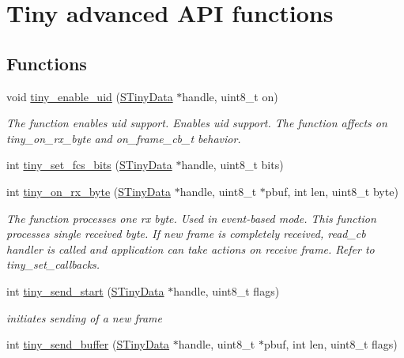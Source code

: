 \hypertarget{group__ADVANCED__API}{}\section{Tiny advanced A\+P\+I functions}
\label{group__ADVANCED__API}
\subsection*{Functions}
\begin{DoxyCompactItemize}
\item 
void \hyperlink{group__ADVANCED__API_gac5cabf56a5b22e96036b9e5bff926f1d}{tiny\+\_\+enable\+\_\+uid} (\hyperlink{structSTinyData}{S\+Tiny\+Data} $\ast$handle, uint8\+\_\+t on)
\begin{DoxyCompactList}\small\item\em The function enables uid support. Enables uid support. The function affects on tiny\+\_\+on\+\_\+rx\+\_\+byte and on\+\_\+frame\+\_\+cb\+\_\+t behavior. \end{DoxyCompactList}\item 
int \hyperlink{group__ADVANCED__API_ga5e66725a2818491d4e2b1134951d9229}{tiny\+\_\+set\+\_\+fcs\+\_\+bits} (\hyperlink{structSTinyData}{S\+Tiny\+Data} $\ast$handle, uint8\+\_\+t bits)
\item 
int \hyperlink{group__ADVANCED__API_gaaf9bf6423bd0b8388c3387225b805278}{tiny\+\_\+on\+\_\+rx\+\_\+byte} (\hyperlink{structSTinyData}{S\+Tiny\+Data} $\ast$handle, uint8\+\_\+t $\ast$pbuf, int len, uint8\+\_\+t byte)
\begin{DoxyCompactList}\small\item\em The function processes one rx byte. Used in event-\/based mode. This function processes single received byte. If new frame is completely received, read\+\_\+cb handler is called and application can take actions on receive frame. Refer to tiny\+\_\+set\+\_\+callbacks. \end{DoxyCompactList}\item 
int \hyperlink{group__ADVANCED__API_ga159189fa29f3eaa79a76a3fa87b31084}{tiny\+\_\+send\+\_\+start} (\hyperlink{structSTinyData}{S\+Tiny\+Data} $\ast$handle, uint8\+\_\+t flags)
\begin{DoxyCompactList}\small\item\em initiates sending of a new frame \end{DoxyCompactList}\item 
int \hyperlink{group__ADVANCED__API_gabe04a4e76adc5421deac4e3699a15646}{tiny\+\_\+send\+\_\+buffer} (\hyperlink{structSTinyData}{S\+Tiny\+Data} $\ast$handle, uint8\+\_\+t $\ast$pbuf, int len, uint8\+\_\+t flags)

\end{DoxyCompactItemize}
